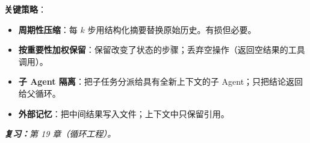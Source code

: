 \begin{questionbox}
\textbf{关键策略}：
\begin{itemize}
  \item \textbf{周期性压缩}：每 $k$ 步用结构化摘要替换原始历史。有损但必要。
  \item \textbf{按重要性加权保留}：保留改变了状态的步骤；丢弃空操作（返回空结果的工具调用）。
  \item \textbf{子 Agent 隔离}：把子任务分派给具有全新上下文的子 Agent；只把结论返回给父循环。
  \item \textbf{外部记忆}：把中间结果写入文件；上下文中只保留引用。
\end{itemize}

\emph{\textbf{复习：}第 19 章（循环工程）。}
\end{questionbox}

